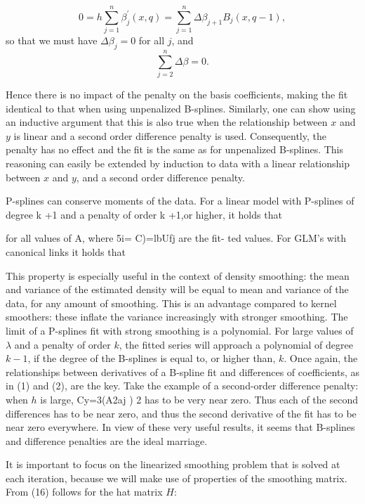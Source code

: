\documentclass[12pt]{article}
\newcommand*\needsparaphrased{\color{red}}
\begin{document}
\[
0 = h \sum_{j=1}^n \beta^\prime_j\left(x, q\right) = \sum_{j=1}^n \Delta\beta_{j+1} B_j\left(x, q-1\right), 
\]
\noindent
so that we must have $\Delta \beta_j = 0$ for all $j$, and 
\[
\sum_{j=2}^n \Delta \beta = 0.
\]

Hence there is no impact of the penalty on the basis coefficients, making the fit identical to that when using unpenalized B-splines. Similarly, one can show using an inductive argument that this is also true when the relationship between $x$ and $y$ is linear and a second order difference penalty is used. Consequently, the penalty has no effect and the fit is the same as for unpenalized B-splines. This reasoning can easily be extended by induction to data with a linear relationship between $x$ and $y$, and a second order difference penalty. 



P-splines can conserve moments of the data. For a linear model with P-splines of degree k +1 and a penalty of order k +1,or higher, it holds that 

{\needsparaphrased  for all values of A, where 5i= C)=lbUfj are the fit- ted values. For GLM's with canonical links it holds that }

{\needsparaphrased This property is especially useful in the context of density smoothing: the mean and variance of the estimated density will be equal to mean and variance of the data, for any amount of smoothing. This is an advantage compared to kernel smoothers: these inflate the variance increasingly with stronger smoothing. The limit of a P-splines fit with strong smoothing is a polynomial. For large values of $\lambda$ and a penalty of order $k$, the fitted series will approach a polynomial of degree $k-1$, if the degree of the B-splines is equal to, or higher than, $k$. Once again, the relationships between derivatives of a B-spline fit and differences of coefficients, as in (1) and (2), are the key. Take the example of a second-order difference penalty: when $h$ is large, Cy=3(A2aj ) 2 has to be very near zero. Thus each of the second differences has to be near zero, and thus the second derivative of the fit has to be near zero everywhere. In view of these very useful results, it seems that B-splines and difference penalties are the ideal marriage.

It is important to focus on the linearized smoothing problem that is solved at each iteration, because we will make use of properties of the smoothing matrix. From (16) follows for the hat matrix $H$:}
\end{document}
